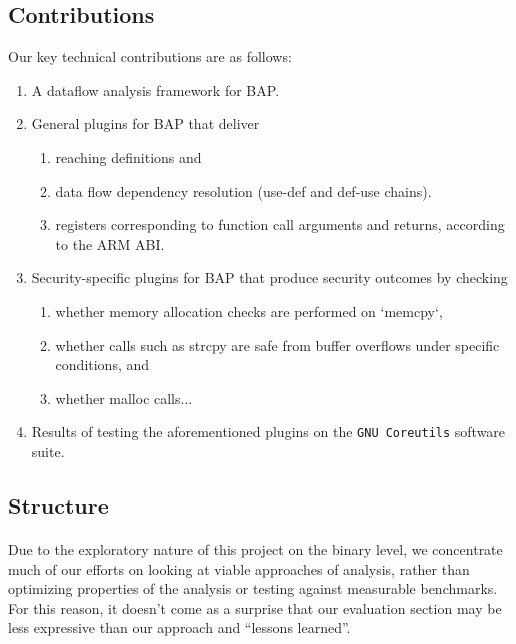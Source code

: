 \documentclass[letterpaper,11pt]{article}
\begin{document}

\subsection{Contributions}

Our key technical contributions are as follows:

\begin{enumerate}
  \item A dataflow analysis framework for BAP.
  \item General plugins for BAP that deliver
    \begin{enumerate}
      \item reaching definitions and
      \item data flow dependency resolution (use-def and def-use chains).
      \item registers corresponding to function call arguments and returns,
            according to the ARM ABI.
    \end{enumerate}
  \item Security-specific plugins for BAP that produce security outcomes by checking
    \begin{enumerate}
      \item whether memory allocation checks are performed on `memcpy`,
      \item whether calls such as strcpy are safe from buffer overflows under
        specific conditions, and
      \item whether malloc calls... %
    \end{enumerate}
  \item Results of testing the aforementioned plugins on the \texttt{GNU Coreutils}
    software suite.
\end{enumerate}

\subsection{Structure}

\paragraph{}
Due to the exploratory nature of this project on the binary level, we
concentrate much of our efforts on looking at viable approaches of analysis,
rather than optimizing properties of the analysis or testing against measurable
benchmarks. For this reason, it doesn't come as a surprise that our evaluation
section may be less expressive than our approach and ``lessons learned''.
\end{document}
